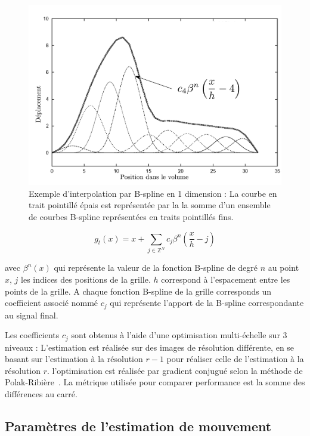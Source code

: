 \begin{figure}
\centering
\includegraphics[width=17cm]{images/Bspline}
\caption[Exemple d'interpolation par B-spline]{Exemple d'interpolation par B-spline en 1 dimension : La courbe en trait pointillé épais est représentée par la la somme d'un ensemble de courbes B-spline représentées en traits pointillés fins.}
\label{fig:Bspline}
\end{figure}


\begin{equation}
  g_t(x)=x + \sum\limits_{j\in \mathbb{Z}^N} c_j \beta^n \left( \frac{x}{h}-j \right)
\end{equation}

avec $\beta^n(x)$ qui représente la valeur de la fonction B-spline de degré $n$ au point $x$, $j$ les indices des positions de la grille. $h$ correspond à l'espacement entre les points de la grille. A chaque fonction B-spline de la grille corresponds un coefficient associé nommé $c_j$ qui représente l'apport de la B-spline correspondante au signal final.

Les coefficients $c_j$ sont obtenus à l'aide d'une optimisation multi-échelle sur 3 niveaux : L'estimation est réalisée sur des images de résolution différente, en se basant sur l'estimation à la résolution $r-1$ pour réaliser celle de l'estimation à la résolution $r$. l'optimisation est réalisée par gradient conjugué selon la méthode de Polak-Ribière~\cite{polak1969note}. La métrique utilisée pour comparer performance est la somme des différences au carré. 


\subsection{Paramètres de l'estimation de mouvement}

